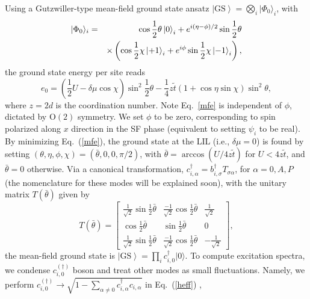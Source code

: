 Using a Gutzwiller-type mean-field ground state ansatz $\left| \text{GS} \right\rangle = \bigotimes_i | \Phi_0 \rangle_i$,
with
\begin{eqnarray}
      | \Phi_0 \rangle_i &=& \cos \frac{1}{2}\theta \ket{0}_i + e^{i (\eta-\phi) / 2} \sin \frac{1}{2}\theta \nonumber\\
      &&  \times \left( \cos \frac{1}{2}\chi \ket{+1}_i + e^{i \phi } \sin \frac{1}{2}\chi \ket{-1}_i   \right),\nonumber
\end{eqnarray}
the ground state energy per site reads
\begin{equation}
  e_0 = \left( \frac{1}{2}U - \delta \mu \cos \chi \right) \sin^2  \frac{1}{2}\theta - \frac{1}{4} z\tilde{t} (1 + \cos \eta \sin  \chi) \sin^2 \theta , \label{mfe}
\end{equation}
where $z=2d$ is the coordination number.
Note Eq.~\eqref{mfe} is independent of $\phi$,
dictated by $\mathrm{O} (2)$ symmetry.
We set $\phi$ to be zero,
corresponding to spin polarized along $x$ direction in the SF
phase (equivalent to setting $\psi_i$ to be real).
By minimizing Eq.~(\ref{mfe}),
the ground state at the LIL (i.e., $\delta \mu = 0$) is found by setting $(\theta, \eta, \phi, \chi) = (\bar{\theta}, 0, 0, \pi / 2)$,
with $\bar{\theta} = \arccos (U / 4z \tilde{t})$ for $U < 4z \tilde{t}$,
and $\bar{\theta} = 0$ otherwise.
Via a canonical transformation,
$c_{i, \alpha}^{\dag} = b_{i, \sigma}^{\dag} T_{\sigma \alpha}$,
for $\alpha = 0, A, P$ (the nomenclature for these modes will be explained soon),
with the unitary matrix $T(\bar\theta)$ given by
\begin{equation}
   T(\bar\theta) = \begin{bmatrix}
           \frac{1}{\sqrt{2}} \sin \frac{1}{2}\bar{\theta} & \frac{- 1}{\sqrt{2}}     \cos \frac{1}{2}\bar{\theta} & \frac{1}{\sqrt{2}}\\
     \cos \frac{1}{2}\bar{\theta} & \sin \frac{1}{2}\bar{\theta} & 0\\
     \frac{1}{\sqrt{2}} \sin \frac{1}{2}\bar{\theta} & \frac{- 1}{\sqrt{2}}     \cos \frac{1}{2}\bar{\theta} & - \frac{1}{\sqrt{2}}
  \end{bmatrix},\nonumber
\end{equation}
the mean-field ground state is $\left| \text{GS} \right\rangle = \prod_i c_{i,0}^{\dag} |0 \rangle$.
To compute excitation spectra,
we condense $c_{i,0}^{(\dagger)}$ boson and treat other modes as small fluctuations.
Namely, we perform $c_{i, 0}^{(\dagger)} \rightarrow \sqrt{1 - \sum_{\alpha \neq 0} c_{i, \alpha}^{\dag} c_{i, \alpha}}$ in Eq.~(\ref{heff}) \cite{Auerbach1994},
